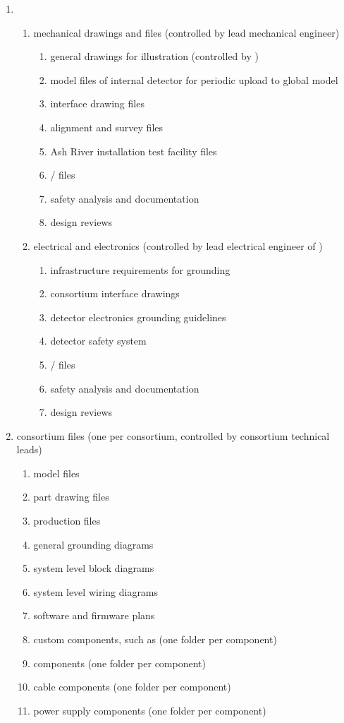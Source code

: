 \begin{enumerate}
 \item {}
 \begin{enumerate}
  \item mechanical drawings and files (controlled by  lead mechanical engineer)
  \begin{enumerate}
    \item {} general drawings for illustration (controlled by )
    \item \threed model files of internal detector for periodic upload to global model
    \item \twod interface drawing files
    \item alignment and survey files
    \item Ash River installation test facility files
    \item {}/ files
    \item safety analysis and documentation
    \item design reviews
  \end{enumerate}
  \item electrical and electronics (controlled by lead electrical engineer of )
  \begin{enumerate}
    \item infrastructure requirements for grounding
    \item consortium interface drawings
    \item detector electronics grounding guidelines
    \item detector safety system
    \item {}/ files
    \item safety analysis and documentation
      \item design reviews
  \end{enumerate}
 \end{enumerate}
 \item consortium files (one per consortium, controlled by consortium technical leads)
 \begin{enumerate}
   \item \threed model files
   \item \twod part drawing files
   \item production files
   \item general grounding diagrams
   \item system level block diagrams
   \item system level wiring diagrams
   \item software and firmware plans
   \item custom components, such as  (one folder per component)
   \item {} components (one folder per component)
   \item cable components (one folder per component)
   \item power supply components (one folder per component)
 \end{enumerate}
\end{enumerate}


